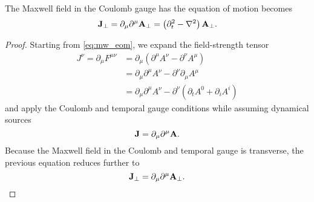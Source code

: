 \begin{lemma}\label{thm:mw_coulomb_eom}
	The Maxwell field in the Coulomb gauge has the equation of motion becomes
	\begin{equation}
		\vb{J}_\perp
		=
		\partial_\mu \partial^\mu
		\vb{A}_\perp
		=
		\left(
			\partial_t^2
			-
			\laplacian
		\right)
		\vb{A}_\perp
		\label{eq:mw_coulomb_eom}
		.
	\end{equation}
\end{lemma}
\begin{proof}
	Starting from \cref{eq:mw_eom}, we expand the field-strength tensor
	\begin{equation*}
		\begin{split}
			J^\nu
			=
			\partial_\mu
			F^{\mu\nu}
			&=
			\partial_\mu
			\left(
				\partial^\mu
				A^\nu
				-
				\partial^\nu
				A^\mu
			\right)
			\\
			&=
			\partial_\mu
			\partial^\mu
			A^\nu
			-
			\partial^\nu
			\partial_\mu
			A^\mu
			\\
			&=
			\partial_\mu
			\partial^\mu
			A^\nu
			-
			\partial^\nu
			\left(
				\partial_t A^0
				+
				\partial_i A^i
			\right)
		\end{split}
	\end{equation*}
	and apply the Coulomb and temporal gauge conditions while assuming dynamical sources
	\begin{equation*}
		\vb{J}
		=
		\partial_\mu
		\partial^\mu
		\vb{A}
		.
	\end{equation*}
	Because the Maxwell field in the Coulomb and temporal gauge is transverse, the previous equation reduces further to
	\begin{equation*}
		\vb{J}_\perp
		=
		\partial_\mu
		\partial^\mu
		\vb{A}_\perp
		.		
	\end{equation*}
\end{proof}

